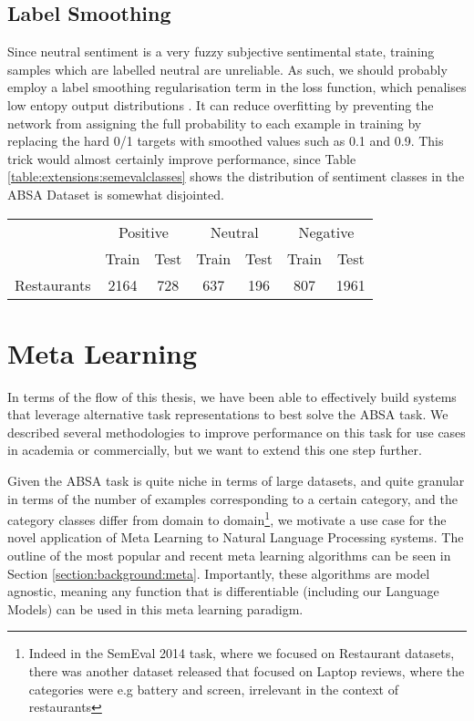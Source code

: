 \subsection{Label Smoothing}
Since neutral sentiment is a very fuzzy subjective sentimental state, training samples which are labelled neutral are unreliable. As such, we should probably employ a label smoothing regularisation term in the loss function, which penalises low entopy output distributions \cite{Szegedy}. It can reduce overfitting by preventing the network from assigning the full probability to each example in training by replacing the hard 0/1 targets with smoothed values such as 0.1 and 0.9. This trick would almost certainly improve performance, since Table \ref{table:extensions:semevalclasses} shows the distribution of sentiment classes in the ABSA Dataset is somewhat disjointed.
\begin{center}
	\begin{tabular}{c@{\qquad}ccc@{\qquad}ccc}
		\toprule
		\multirow{2}{*}{\raisebox{-\heavyrulewidth}{Dataset}} & \multicolumn{2}{c}{Positive} & \multicolumn{2}{c}{Neutral} &  \multicolumn{2}{c}{Negative} \\
		\cmidrule{2-7}
		& Train & Test & Train & Test & Train & Test\\
		\midrule
		Restaurants & 2164 & 728 & 637 & 196 & 807 & 1961 \\
		\bottomrule
	\end{tabular}
	\label{table:extensions:semevalclasses}
\end{center}

\section{Meta Learning} \label{section:extensions:meta}
In terms of the flow of this thesis, we have been able to effectively build systems that leverage alternative task representations to best solve the ABSA task. We described several methodologies to improve performance on this task for use cases in academia or commercially, but we want to extend this one step further.

Given the ABSA task is quite niche in terms of large datasets, and quite granular in terms of the number of examples corresponding to a certain category, and the category classes differ from domain to domain\footnote{Indeed in the SemEval 2014 task, where we focused on Restaurant datasets, there was another dataset released that focused on Laptop reviews, where the categories were e.g battery and screen, irrelevant in the context of restaurants}, we motivate a use case for the novel application of Meta Learning to Natural Language Processing systems. The outline of the most popular and recent meta learning algorithms can be seen in Section \ref{section:background:meta}. Importantly, these algorithms are model agnostic, meaning any function that is differentiable (including our Language Models) can be used in this meta learning paradigm.

